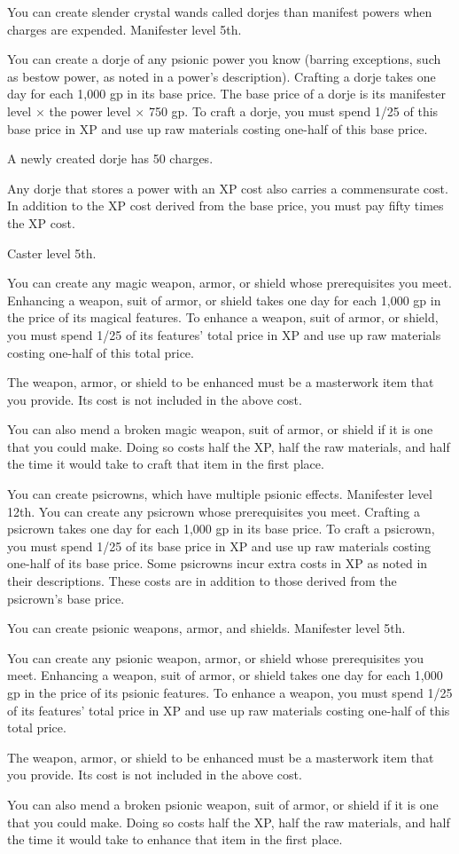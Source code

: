 {You can create slender crystal wands called dorjes than manifest powers when charges are expended.}
{Manifester level 5th.}
{You can create a dorje of any psionic power you know (barring exceptions, such as bestow power, as noted in a power’s description). Crafting a dorje takes one day for each 1,000 gp in its base price. The base price of a dorje is its manifester level $\times$ the power level $\times$ 750 gp. To craft a dorje, you must spend 1/25 of this base price in XP and use up raw materials costing one-half of this base price.

A newly created dorje has 50 charges.

Any dorje that stores a power with an XP cost also carries a commensurate cost. In addition to the XP cost derived from the base price, you must pay fifty times the XP cost.}{}{}

{Caster level 5th.}
{You can create any magic weapon, armor, or shield whose prerequisites you meet. Enhancing a weapon, suit of armor, or shield takes one day for each 1,000 gp in the price of its magical features. To enhance a weapon, suit of armor, or shield, you must spend 1/25 of its features’ total price in XP and use up raw materials costing one-half of this total price.

The weapon, armor, or shield to be enhanced must be a masterwork item that you provide. Its cost is not included in the above cost.

You can also mend a broken magic weapon, suit of armor, or shield if it is one that you could make. Doing so costs half the XP, half the raw materials, and half the time it would take to craft that item in the first place.}

{You can create psicrowns, which have multiple psionic effects.}
{Manifester level 12th.}
{You can create any psicrown whose prerequisites you meet. Crafting a psicrown takes one day for each 1,000 gp in its base price. To craft a psicrown, you must spend 1/25 of its base price in XP and use up raw materials costing one-half of its base price. Some psicrowns incur extra costs in XP as noted in their descriptions. These costs are in addition to those derived from the psicrown’s base price.}{}{}

{You can create psionic weapons, armor, and shields.}
{Manifester level 5th.}
{You can create any psionic weapon, armor, or shield whose prerequisites you meet. Enhancing a weapon, suit of armor, or shield takes one day for each 1,000 gp in the price of its psionic features. To enhance a weapon, you must spend 1/25 of its features’ total price in XP and use up raw materials costing one-half of this total price.

The weapon, armor, or shield to be enhanced must be a masterwork item that you provide. Its cost is not included in the above cost.

You can also mend a broken psionic weapon, suit of armor, or shield if it is one that you could make. Doing so costs half the XP, half the raw materials, and half the time it would take to enhance that item in the first place.}{}{}

